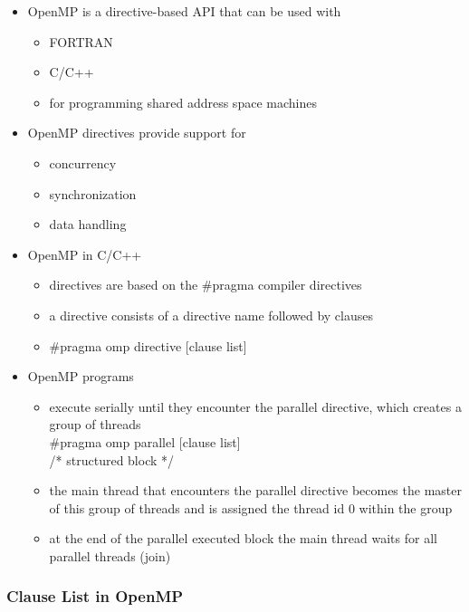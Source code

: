 \begin{itemize}
\tightlist
\item
  OpenMP is a directive-based API that can be used with

  \begin{itemize}
  \tightlist
  \item
    FORTRAN
  \item
    C/C++
  \item
    for programming shared address space machines
  \end{itemize}
\item
  OpenMP directives provide support for

  \begin{itemize}
  \tightlist
  \item
    concurrency
  \item
    synchronization
  \item
    data handling
  \end{itemize}
\item
  OpenMP in C/C++

  \begin{itemize}
  \tightlist
  \item
    directives are based on the \#pragma compiler directives
  \item
    a directive consists of a directive name followed by clauses
  \item
    \#pragma omp directive {[}clause list{]}
  \end{itemize}
\item
  OpenMP programs

  \begin{itemize}
  \tightlist
  \item
    execute serially until they encounter the parallel directive, which
    creates a group of threads\\
    \#pragma omp parallel {[}clause list{]}\\
    /* structured block */
  \item
    the main thread that encounters the parallel directive becomes the
    master of this group of threads and is assigned the thread id 0
    within the group
  \item
    at the end of the parallel executed block the main thread waits for
    all parallel threads (join)
  \end{itemize}
\end{itemize}

\hypertarget{clause-list-in-openmp}{%
\subsubsection{Clause List in OpenMP}\label{clause-list-in-openmp}}

